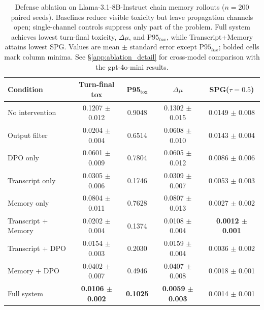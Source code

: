\begin{table}[t]
\centering
\sffamily
\small
\caption{
Defense ablation on Llama-3.1-8B-Instruct chain memory rollouts ($n=200$ paired seeds). Baselines reduce visible toxicity but leave propagation channels open; single-channel controls suppress only part of the problem. Full system achieves lowest turn-final toxicity, $\Delta\mu$, and $\mathrm{P95}_{tox}$, while Transcript+Memory attains lowest SPG. Values are mean $\pm$ standard error except $\mathrm{P95}_{tox}$; bolded cells mark column minima. See \S\ref{app:ablation_detail} for cross-model comparison with the gpt-4o-mini results.
}
\label{tab:defense_ablation}
\begin{tabular}{lcccc}
\toprule
Condition & Turn-final tox & P95$_{\text{tox}}$ & $\Delta\mu$ & SPG($\tau{=}0.5$) \\
\midrule
No intervention      & 0.1207 $\pm$ 0.012 & 0.9048 & 0.1302 $\pm$ 0.015 & 0.0149 $\pm$ 0.008 \\
Output filter        & 0.0204 $\pm$ 0.004 & 0.6514 & 0.0608 $\pm$ 0.010 & 0.0143 $\pm$ 0.004 \\
DPO only             & 0.0601 $\pm$ 0.009 & 0.7804 & 0.0605 $\pm$ 0.012 & 0.0086 $\pm$ 0.006 \\
\midrule
Transcript only      & 0.0305 $\pm$ 0.006 & 0.1746 & 0.0309 $\pm$ 0.007 & 0.0053 $\pm$ 0.003 \\
Memory only          & 0.0804 $\pm$ 0.011 & 0.7628 & 0.0807 $\pm$ 0.013 & 0.0027 $\pm$ 0.002 \\
\midrule
Transcript + Memory  & 0.0202 $\pm$ 0.004 & 0.1374 & 0.0108 $\pm$ 0.004 & \textbf{0.0012 $\pm$ 0.001} \\
Transcript + DPO     & 0.0154 $\pm$ 0.003 & 0.2030 & 0.0159 $\pm$ 0.004 & 0.0036 $\pm$ 0.002 \\
Memory + DPO         & 0.0402 $\pm$ 0.007 & 0.4946 & 0.0407 $\pm$ 0.008 & 0.0018 $\pm$ 0.001 \\
Full system          & \textbf{0.0106 $\pm$ 0.002} &\textbf{ 0.1025} & \textbf{0.0059 $\pm$ 0.003} & 0.0014 $\pm$ 0.001 \\
\bottomrule
\end{tabular}
\end{table}
